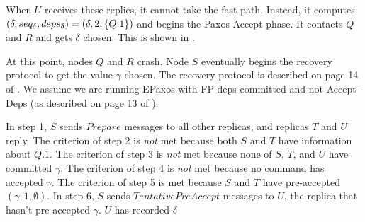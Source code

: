 \documentclass{mwhittaker}
\newcommand{\instance}[7][top]{{%
  \ifthenelse{\NOT \(
    \equal{#6}{} \OR
    \equal{#6}{pre-accepted} \OR
    \equal{#6}{accepted} \OR
    \equal{#6}{committed}
  \)}{%
    \errmessage{Instance status must be pre-accepted, accepted, or committed.}
  }{}

  \newcommand{\instancecolor}{black}
  \newcommand{\abbreviatedstatus}{}
  \ifthenelse{\equal{#6}{pre-accepted}}{%
    \renewcommand{\instancecolor}{flatblue}
    \renewcommand{\abbreviatedstatus}{pre}
  }{\ifthenelse{\equal{#6}{accepted}}{%
    \renewcommand{\instancecolor}{flatred}
    \renewcommand{\abbreviatedstatus}{acc}
  }{\ifthenelse{\equal{#6}{committed}}{%
    \renewcommand{\instancecolor}{flatgreen}
    \renewcommand{\abbreviatedstatus}{com}
  }{%
  }}}

  \ifthenelse{\equal{#1}{top}}{%
    \newcommand{\instancelabel}{90}
  }{\ifthenelse{\equal{#1}{bottom}}{%
    \newcommand{\instancelabel}{270}
  }{%
    \errmessage{The optional instance argument must be top or bottom, not #1.}
  }}

  \node[
    draw=\instancecolor,
    line width=1pt,
    label={\instancelabel:$#3$},
    minimum height=1.5cm,
    minimum width=1.5cm,
    align=center
  ] (#2) at (#7) {\abbreviatedstatus{}\\$#4$\\$#5$};%
}}
\newcommand{\Qx}{0}
\newcommand{\Rx}{2}
\newcommand{\Sx}{4}
\newcommand{\Tx}{6}
\newcommand{\Ux}{8}
\begin{document}
When $U$ receives these replies, it cannot take the fast path. Instead, it
computes $(\delta, seq_\delta, deps_\delta) = (\delta, 2, \{Q.1\})$ and
begins the Paxos-Accept phase. It contacts $Q$ and $R$ and gets $\delta$
chosen. This is shown in .

\begin{figure}[h]
  \centering


  \caption{}
\end{figure}

At this point, nodes $Q$ and $R$ crash. Node $S$ eventually begins the recovery
protocol to get the value $\gamma$ chosen. The recovery protocol is described
on page 14 of \cite{moraru2013proof}. We assume we are running EPaxos with
FP-deps-committed and not Accept-Deps (as described on page 13 of
\cite{moraru2013proof}).

In step 1, $S$ sends $Prepare$ messages to all other replicas, and replicas $T$
and $U$ reply. The criterion of step 2 is \emph{not} met because both $S$ and
$T$ have information about $Q.1$. The criterion of step 3 is \emph{not} met
because none of $S$, $T$, and $U$ have committed $\gamma$. The criterion of
step 4 is \emph{not} met because no command has accepted $\gamma$. The
criterion of step 5 is met because $S$ and $T$ have pre-accepted $(\gamma, 1,
\emptyset{})$. In step 6, $S$ sends $TentativePreAccept$ messages to $U$, the
replica that hasn't pre-accepted $\gamma$. $U$ has recorded $\delta$



\end{document}
